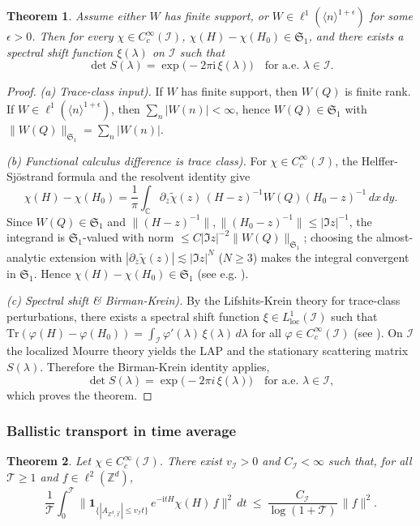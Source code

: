 \documentclass[10pt]{amsart} %
\newcommand{\C}{{\mathbb{C}}}
\newcommand{\1}{{\mathbb{I}}}
\newcommand{\Ic}{\mathcal{I}}
\numberwithin{equation}{section}
\newtheorem{theorem}{Theorem}[section]%
\begin{document}
\begin{theorem}\label{thm:BK}
Assume either $W$ has finite support, or $W\in \ell^1(\langle n\rangle^{1+\epsilon})$ for some $\epsilon>0$.
Then for every $\chi\in C_c^\infty(\mathcal{I})$, $\chi(H)-\chi(H_0)\in\mathfrak{S}_1$, and there exists a spectral shift
function $\xi(\lambda)$ on $\mathcal{I}$ such that
\[
\det S(\lambda)=\exp\!\bigl(-2\pi \mathrm{i}\,\xi(\lambda)\bigr)\quad\text{for a.e. }\lambda\in \mathcal{I}.
\]
\end{theorem}
\begin{proof}
\emph{(a) Trace-class input).}
If $W$ has finite support, then $W(Q)$ is finite rank. If $W\in\ell^1(\langle n\rangle^{1+\epsilon})$,
then $\sum_{n}|W(n)|<\infty$, hence $W(Q)\in\mathfrak S_1$ with
$\|W(Q)\|_{\mathfrak S_1}=\sum_{n}|W(n)|$.

\emph{(b) Functional calculus difference is trace class).}
For $\chi\in C_c^\infty(\Ic)$, the Helffer-Sj{\"o}strand formula and the resolvent identity give
\[
\chi(H)-\chi(H_0)=\frac{1}{\pi}\!\int_{\C}\!\partial_{\bar z}\widetilde\chi(z)\,
(H-z)^{-1}W(Q)(H_0-z)^{-1}\,dx\,dy.
\]
Since $W(Q)\in\mathfrak S_1$ and $\|(H-z)^{-1}\|,\|(H_0-z)^{-1}\|\le|\Im z|^{-1}$,
the integrand is $\mathfrak S_1$-valued with norm $\le C|\Im z|^{-2}\|W(Q)\|_{\mathfrak S_1}$;
choosing the almost-analytic extension with $|\partial_{\bar z}\widetilde\chi(z)|\lesssim|\Im z|^N$ ($N\ge3$)
makes the integral convergent in $\mathfrak S_1$. Hence $\chi(H)-\chi(H_0)\in\mathfrak S_1$
(see e.g. \cite[App.~A \& Ch.~7]{ABG}).

\emph{(c) Spectral shift \& Birman-Krein).}
By the Lifshits-Krein theory for trace-class perturbations, there exists a spectral shift
function $\xi\in L^1_{\mathrm{loc}}(\Ic)$ such that
$\mathrm{Tr}\!\left(\varphi(H)-\varphi(H_0)\right)=\int_\Ic\varphi'(\lambda)\,\xi(\lambda)\,d\lambda$
for all $\varphi\in C_c^\infty(\Ic)$ (see \cite[Ch.~8]{ABG}).
On $\Ic$ the localized Mourre theory yields the LAP and the stationary scattering matrix $S(\lambda)$.
Therefore the Birman-Krein identity applies,
\[
\det S(\lambda)=\exp\!\bigl(-2\pi i\,\xi(\lambda)\bigr)\quad\text{for a.e. }\lambda\in\Ic,
\]
which proves the theorem.
\end{proof}

\subsubsection{Ballistic transport in time average}\label{subsubsec:ballistic}
\begin{theorem}\label{thm:ballistic-lb}
Let $\chi\in C_c^\infty(\mathcal{I})$. There exist $v_{\mathcal{I}}>0$ and $C_{\mathcal{I}}<\infty$ such that, for all $\mathcal{T}\ge1$ and $f\in\ell^2(\mathbb{Z}^d)$,
\[
\frac{1}{\mathcal{T}}\int_0^{\mathcal{T}} \big\| \mathbf{1}_{\{|A_{\mathbb{Z}^d,\vec{\mathrm{r}}}|\le v_{\mathcal{I}} t\}}\,e^{-\mathrm{i} tH}\chi(H)\,f\big\|^2\,dt
\ \le\ \frac{C_{\mathcal{I}}}{\log(1+\mathcal{T})}\,\|f\|^2.
\]
\end{theorem}
\end{document}

